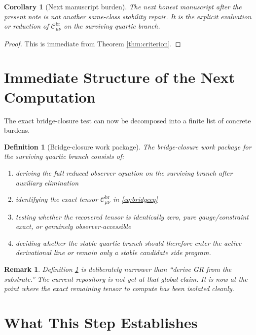 \documentclass[11pt]{article}
\newtheorem{definition}{Definition}
\newtheorem{remark}{Remark}
\newtheorem{corollary}{Corollary}
\begin{document}
\begin{corollary}[Next manuscript burden]
\label{cor:next}
The next honest manuscript after the present note is not another same-class stability repair. It is the explicit evaluation or reduction of \(\mathcal C_{\mu\nu}^{\mathrm{br}}\) on the surviving quartic branch.
\end{corollary}

\begin{proof}
This is immediate from Theorem \ref{thm:criterion}.
\end{proof}

\section{Immediate Structure of the Next Computation}

The exact bridge-closure test can now be decomposed into a finite list of concrete burdens.

\begin{definition}[Bridge-closure work package]
\label{def:package}
The \emph{bridge-closure work package} for the surviving quartic branch consists of:
\begin{enumerate}
    \item deriving the full reduced observer equation on the surviving branch after auxiliary elimination
    \item identifying the exact tensor \(\mathcal C_{\mu\nu}^{\mathrm{br}}\) in \eqref{eq:bridgeeq}
    \item testing whether the recovered tensor is identically zero, pure gauge/constraint exact, or genuinely observer-accessible
    \item deciding whether the stable quartic branch should therefore enter the active derivational line or remain only a stable candidate side program.
\end{enumerate}
\end{definition}

\begin{remark}
Definition \ref{def:package} is deliberately narrower than ``derive GR from the substrate.'' The current repository is not yet at that global claim. It is now at the point where the exact remaining tensor to compute has been isolated cleanly.
\end{remark}

\section{What This Step Establishes}
\end{document}
